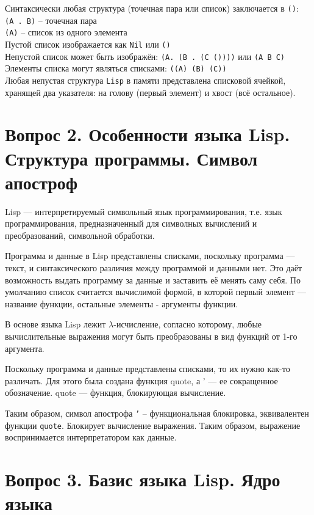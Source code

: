 Синтаксически любая структура (точечная пара или список) заключается в {\texttt{()}}:\\
{\texttt{(A . B)}} -- точечная пара\\
{\texttt{(A)}} -- список из одного элемента\\
Пустой список изображается как {\texttt{Nil}} или {\texttt{()}}\\
Непустой список может быть изображён: {\texttt{(A. (B . (C ())))}} или {\texttt{(A B C)}}\\
Элементы списка могут являться списками: {\texttt{((A) (B) (C))}}\\
Любая непустая структура {\texttt{Lisp}} в памяти представлена списковой ячейкой, хранящей два указателя: на голову (первый элемент) и хвост (всё остальное).

	
\section*{Вопрос 2. Особенности языка Lisp. Структура программы. Символ апостроф}

Lisp --- интерпретируемый символьный язык программирования, т.е. язык программирования, предназначенный для символных вычислений и преобразований, символьной обработки.

Программа и данные в Lisp представлены списками, поскольку программа --- текст, и синтаксического различия между программой и данными нет.
Это даёт возможность выдать программу за данные и заставить её менять саму себя.
По умолчанию список считается вычислимой формой, в которой первый элемент --- название функции, остальные элементы - аргументы функции.

В основе языка Lisp лежит $\lambda$-исчисление, согласно которому, любые вычислительные выражения могут быть преобразованы в вид функций от 1-го аргумента.

Поскольку программа и данные представлены списками, то их нужно как-то различать. 
Для этого была создана функция quote, а ' --- ее сокращенное обозначение. 
quote --- функция, блокирующая вычисление.

Таким образом, символ апострофа {\texttt{'}} -- функциональная блокировка, эквивалентен функции {\texttt{quote}}. Блокирует вычисление выражения. Таким образом, выражение воспринимается интерпретатором как данные.

\section*{Вопрос 3. Базис языка Lisp. Ядро языка}

